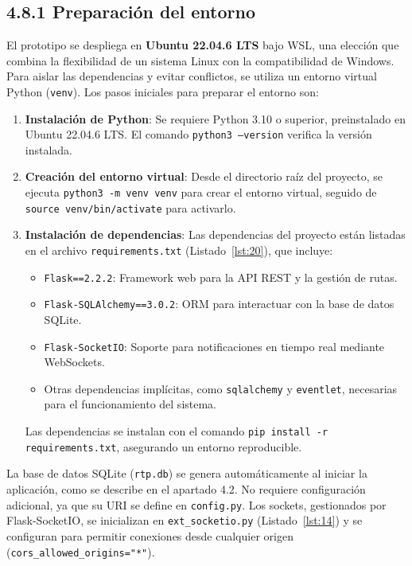 \subsection*{4.8.1 \; Preparación del entorno}

El prototipo se despliega en \textbf{Ubuntu 22.04.6 LTS} bajo WSL, una elección que combina la flexibilidad de un sistema Linux con la compatibilidad de Windows. Para aislar las dependencias y evitar conflictos, se utiliza un entorno virtual Python (\texttt{venv}). Los pasos iniciales para preparar el entorno son:

\begin{enumerate}
    \item \textbf{Instalación de Python}: Se requiere Python 3.10 o superior, preinstalado en Ubuntu 22.04.6 LTS. El comando \texttt{python3 --version} verifica la versión instalada.
    \item \textbf{Creación del entorno virtual}: Desde el directorio raíz del proyecto, se ejecuta \texttt{python3 -m venv venv} para crear el entorno virtual, seguido de \texttt{source venv/bin/activate} para activarlo.
    \item \textbf{Instalación de dependencias}: Las dependencias del proyecto están listadas en el archivo \texttt{requirements.txt} (Listado~\ref{lst:20}), que incluye:
        \begin{itemize}
            \item \texttt{Flask==2.2.2}: Framework web para la API REST y la gestión de rutas.
            \item \texttt{Flask-SQLAlchemy==3.0.2}: ORM para interactuar con la base de datos SQLite.
            \item \texttt{Flask-SocketIO}: Soporte para notificaciones en tiempo real mediante WebSockets.
            \item Otras dependencias implícitas, como \texttt{sqlalchemy} y \texttt{eventlet}, necesarias para el funcionamiento del sistema.
        \end{itemize}
        Las dependencias se instalan con el comando \texttt{pip install -r requirements.txt}, asegurando un entorno reproducible.
\end{enumerate}

La base de datos SQLite (\texttt{rtp.db}) se genera automáticamente al iniciar la aplicación, como se describe en el apartado 4.2. No requiere configuración adicional, ya que su URI se define en \texttt{config.py}. Los sockets, gestionados por Flask-SocketIO, se inicializan en \texttt{ext\_socketio.py} (Listado~\ref{lst:14}) y se configuran para permitir conexiones desde cualquier origen (\texttt{cors\_allowed\_origins="*"}).

